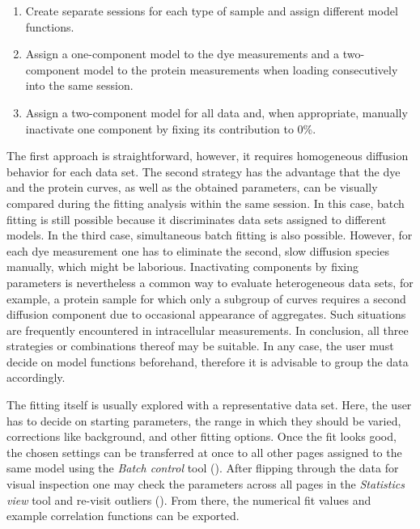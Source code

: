 \begin{enumerate}
\item Create separate sessions for each type of sample and assign different model functions.
\item Assign a one-component model to the dye measurements and a two-component model to the protein measurements when loading consecutively into the same session.
\item Assign a two-component model for all data and, when appropriate, manually inactivate one component by fixing its contribution to 0\%.
\end{enumerate}


The first approach is straightforward, however, it requires homogeneous diffusion behavior for each data set. The second strategy has the advantage that the dye and the protein curves, as well as the obtained parameters, can be visually compared during the fitting analysis within the same session. In this case, batch fitting is still possible because it discriminates data sets assigned to different models. In the third case, simultaneous batch fitting is also possible. However, for each dye measurement one has to eliminate the second, slow diffusion species manually, which might be laborious. Inactivating components by fixing parameters is nevertheless a common way to evaluate heterogeneous data sets, for example, a protein sample for which only a subgroup of curves requires a second diffusion component due to occasional appearance of aggregates. Such situations are frequently encountered in intracellular measurements. In conclusion, all three strategies or combinations thereof may be suitable. In any case, the user must decide on model functions beforehand, therefore it is advisable to group the data accordingly.

The fitting itself is usually explored with a representative data set. Here, the user has to decide on starting parameters, the range in which they should be varied, corrections like background, and other fitting options. Once the fit looks good, the chosen settings can be transferred at once to all other pages assigned to the same model using the \textit{Batch control} tool (). After flipping through the data for visual inspection one may check the parameters across all pages in the \textit{Statistics view} tool and re-visit outliers (). From there, the numerical fit values and example correlation functions can be exported.

